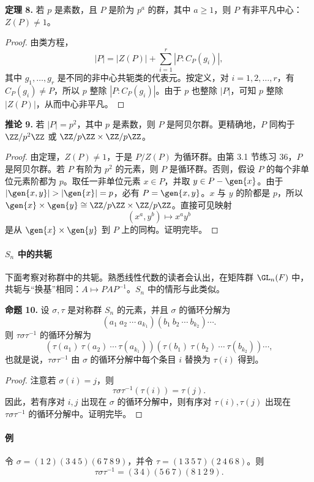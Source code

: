 \medskip
\noindent\textbf{定理 8.} 若 $p$ 是素数，且 $P$ 是阶为 $p^a$ 的群，其中 $a\geq1$，则 $P$ 有非平凡中心：$Z(P)\neq1$。

\begin{proof}
由类方程，
\[
  |P|=|Z(P)|+\sum_{i=1}^r |P:C_P(g_i)|,
\]
其中 $g_1,\ldots,g_r$ 是不同的非中心共轭类的代表元。按定义，对 $i=1,2,\ldots,r$，有 $C_P(g_i)\neq P$，所以 $p$ 整除 $|P:C_P(g_i)|$。由于 $p$ 也整除 $|P|$，可知 $p$ 整除 $|Z(P)|$，从而中心非平凡。
\end{proof}

\medskip
\noindent\textbf{推论 9.} 若 $|P|=p^2$，其中 $p$ 是素数，则 $P$ 是阿贝尔群。更精确地，$P$ 同构于 $\ZZ/p^2\ZZ$ 或 $\ZZ/p\ZZ\times\ZZ/p\ZZ$。

\begin{proof}
由定理，$Z(P)\neq1$，于是 $P/Z(P)$ 为循环群。由第 3.1 节练习 36，$P$ 是阿贝尔群。若 $P$ 有阶为 $p^2$ 的元素，则 $P$ 是循环群。否则，假设 $P$ 的每个非单位元素阶都为 $p$。取任一非单位元素 $x\in P$，并取 $y\in P-\gen{x}$。由于 $|\gen{x,y}|>|\gen{x}|=p$，必有 $P=\gen{x,y}$。$x$ 与 $y$ 的阶都是 $p$，所以 $\gen{x}\times\gen{y}\cong \ZZ/p\ZZ\times\ZZ/p\ZZ$。直接可见映射
\[
  (x^a,y^b)\longmapsto x^ay^b
\]
是从 $\gen{x}\times\gen{y}$ 到 $P$ 上的同构。证明完毕。
\end{proof}

\paragraph{$S_n$ 中的共轭}
下面考察对称群中的共轭。熟悉线性代数的读者会认出，在矩阵群 $\GL_n(F)$ 中，共轭与“换基”相同：$A\mapsto PAP^{-1}$。$S_n$ 中的情形与此类似。

\medskip
\noindent\textbf{命题 10.} 设 $\sigma,\tau$ 是对称群 $S_n$ 的元素，并且 $\sigma$ 的循环分解为
\[
  (a_1\ a_2\ \cdots\ a_{k_1})(b_1\ b_2\ \cdots\ b_{k_2})\cdots.
\]
则 $\tau\sigma\tau^{-1}$ 的循环分解为
\[
  (\tau(a_1)\ \tau(a_2)\ \cdots\ \tau(a_{k_1}))
  (\tau(b_1)\ \tau(b_2)\ \cdots\ \tau(b_{k_2}))\cdots,
\]
也就是说，$\tau\sigma\tau^{-1}$ 由 $\sigma$ 的循环分解中每个条目 $i$ 替换为 $\tau(i)$ 得到。

\begin{proof}
注意若 $\sigma(i)=j$，则
\[
  \tau\sigma\tau^{-1}(\tau(i))=\tau(j).
\]
因此，若有序对 $i,j$ 出现在 $\sigma$ 的循环分解中，则有序对 $\tau(i),\tau(j)$ 出现在 $\tau\sigma\tau^{-1}$ 的循环分解中。证明完毕。
\end{proof}

\paragraph{例}
令 $\sigma=(1\ 2)(3\ 4\ 5)(6\ 7\ 8\ 9)$，并令 $\tau=(1\ 3\ 5\ 7)(2\ 4\ 6\ 8)$。则
\[
  \tau\sigma\tau^{-1}=(3\ 4)(5\ 6\ 7)(8\ 1\ 2\ 9).
\]

